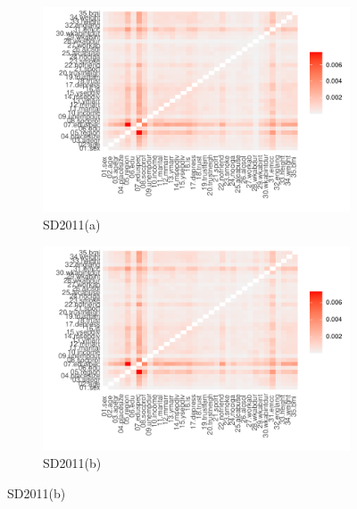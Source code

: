 \begin{figure}[ht]
  \caption{Synthpop two-way correlation  (pMSE)}
  \label{fig:synthpop_fidelity_two_way}
  \centering

  \begin{subfigure}{0.75\textwidth}
    \includegraphics[width=\linewidth]{../graphs/synthpop/synthpop_fidelity_twoway_sd2011.pdf}
    \caption{SD2011(a)}
    \label{fig:synthpop_fidelity_two_way_subfig-a}
  \end{subfigure}

  \begin{subfigure}{0.75\textwidth}
    \includegraphics[width=\linewidth]{../graphs/synthpop/synthpop_fidelity_twoway_sd2011_clean.pdf}
    \caption{SD2011(b)}
    \label{fig:synthpop_fidelity_two_way_subfig-b}
  \end{subfigure}


\end{figure}
